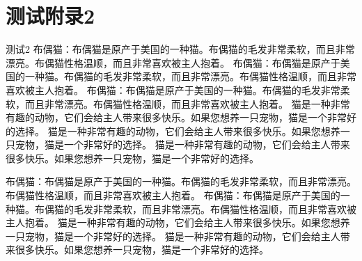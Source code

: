 \documentclass[engineeringmaster]{hquThesis}
\begin{document}
\chapter{测试附录2}
测试2
布偶猫：布偶猫是原产于美国的一种猫。布偶猫的毛发非常柔软，而且非常漂亮。布偶猫性格温顺，而且非常喜欢被主人抱着。
布偶猫：布偶猫是原产于美国的一种猫。布偶猫的毛发非常柔软，而且非常漂亮。布偶猫性格温顺，而且非常喜欢被主人抱着。
布偶猫：布偶猫是原产于美国的一种猫。布偶猫的毛发非常柔软，而且非常漂亮。布偶猫性格温顺，而且非常喜欢被主人抱着。
猫是一种非常有趣的动物，它们会给主人带来很多快乐。如果您想养一只宠物，猫是一个非常好的选择。
猫是一种非常有趣的动物，它们会给主人带来很多快乐。如果您想养一只宠物，猫是一个非常好的选择。
猫是一种非常有趣的动物，它们会给主人带来很多快乐。如果您想养一只宠物，猫是一个非常好的选择。

布偶猫：布偶猫是原产于美国的一种猫。布偶猫的毛发非常柔软，而且非常漂亮。布偶猫性格温顺，而且非常喜欢被主人抱着。
布偶猫：布偶猫是原产于美国的一种猫。布偶猫的毛发非常柔软，而且非常漂亮。布偶猫性格温顺，而且非常喜欢被主人抱着。
猫是一种非常有趣的动物，它们会给主人带来很多快乐。如果您想养一只宠物，猫是一个非常好的选择。
猫是一种非常有趣的动物，它们会给主人带来很多快乐。如果您想养一只宠物，猫是一个非常好的选择。




\backmatter


\end{document}
